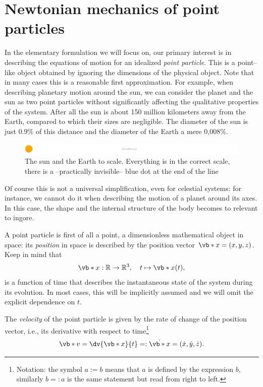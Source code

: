 \documentclass[english,fontsize=11pt,paper=b5]{scrbook}
\theoremstyle{definition}
\begin{document}
  \section{Newtonian mechanics of point particles}

  In the elementary formulation we will focus on, our primary interest is in describing the equations of motion for an idealized \emph{point particle}.
  This is a point--like object obtained by ignoring the dimensions of the physical object.
  Note that in many cases this is a reasonable first approximation.
  For example, when describing planetary motion around the sun, we can consider the planet and the sun as two point particles without significantly affecting the qualitative properties of the system.
  After all the sun is about 150 million kilometers away from the Earth, compared to which their sizes are negligible.
    The diameter of the sun is just 0.9\% of this distance and the diameter of the Earth a mere 0,008\%.
  \begin{figure}
    \centering
    \includegraphics[width=.9\linewidth]{images/sun-earth-scale.pdf}
    \caption{The sun and the Earth to scale. Everything is in the correct scale, there is a --practically invisible-- blue dot at the end of the line}%
  \end{figure}
    Of course this is not a universal simplification, even for celestial systems: for instance, we cannot do it when describing the motion of a planet around its axes.
  In this case, the shape and the internal structure of the body becomes to relevant to ingore.

   A point particle is first of all a point, a dimensionless mathematical object in space: its \emph{position} in space is described by the position vector $\vb*{x} = (x, y ,z)$.
  Keep in mind that
  \begin{equation}
    \vb*{x} : \mathbb{R}\to\mathbb{R}^3,\quad t \mapsto \vb*{x}(t),
  \end{equation}
  is a function of time that describes the instantaneous state of the system during its evolution.
  In most cases, this will be implicitly assumed and we will omit the explicit dependence on $t$.

  The \emph{velocity} of the point particle is given by the rate of change of the position vector,
  i.e., its derivative with respect to time\footnote{Notation: the symbol $a := b$ means that $a$ is defined by the expression $b$, similarly $b =: a$ is the same statement but read from right to left.}
  \begin{equation}
    \vb*{v} = \dv{\vb*{x}}{t} =: \dot{\vb*{x}} = (\dot{x}, \dot{y}, \dot{z}).
  \end{equation}
\end{document}
